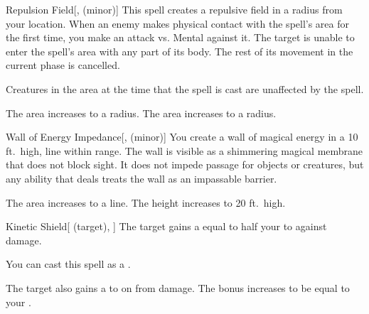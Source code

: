 \lowercase{\hypertarget{spell:Repulsion Field}{}}\label{spell:Repulsion Field}
\begin{freeability}[Rank 3]{\hypertarget{spell:Repulsion Field}{Repulsion Field}}[,  (minor)]
This spell creates a repulsive field in a \areamed radius  from your location.
When an enemy makes physical contact with the spell's area for the first time, you make an attack vs. Mental against it.
\hit The target is unable to enter the spell's area with any part of its body.
The rest of its movement in the current phase is cancelled.

Creatures in the area at the time that the spell is cast are unaffected by the spell.

\rankline
{} The area increases to a \arealarge radius.
 The area increases to a \areahuge radius.
\end{freeability}
\vspace{0.25em}



\lowercase{\hypertarget{spell:Wall of Energy Impedance}{}}\label{spell:Wall of Energy Impedance}
\begin{freeability}[Rank 3]{\hypertarget{spell:Wall of Energy Impedance}{Wall of Energy Impedance}}[,  (minor)]
\targetrule
You create a wall of magical energy in a 10 ft.\ high, \areamed line within \rngmed range.
The wall is visible as a shimmering magical membrane that does not block sight.
It does not impede passage for objects or creatures, but any ability that deals  treats the wall as an impassable barrier.

\rankline
{} The area increases to a \arealarge line.
 The height increases to 20 ft.\ high.
\end{freeability}
\vspace{0.25em}



\lowercase{\hypertarget{spell:Kinetic Shield}{}}\label{spell:Kinetic Shield}
\begin{attuneability}[Rank 4]{\hypertarget{spell:Kinetic Shield}{Kinetic Shield}}[ (target), ]
The target gains a  equal to half your  to  against  damage.

You can cast this spell as a .

\rankline
{} The target also gains a   to  on  from  damage.
 The bonus increases to be equal to your .
\end{attuneability}
\vspace{0.25em}



